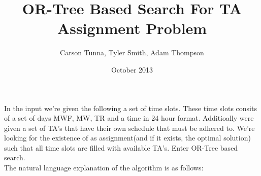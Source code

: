 \documentclass{article}
\title{OR-Tree Based Search For TA Assignment Problem}
\date{October 2013}
\author{Carson Tunna, Tyler Smith, Adam Thompson}
\begin{document}
In the input we're given the following a set of time
slots\footnotemark. These time slots consits of a set of days MWF,
MW, TR and a time in 24 hour format. Additioally were given a set of
TA's that have their own schedule that must be adhered to. We're
looking for the existence of as assignment(and if it exists, the
optimal solution) such that all time slots are filled with available
TA's. Enter OR-Tree based search.\\

The natural language explanation of the algorithm is as follows:\\





\end{document}
